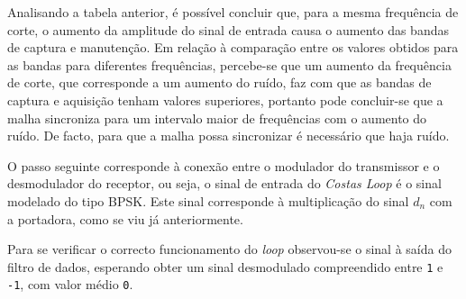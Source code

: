\documentclass[11pt]{article}
\numberwithin{equation}{section}
\begin{document}
Analisando a tabela anterior, é possível concluir que, para a mesma frequência de corte, o aumento da amplitude do sinal de entrada causa o aumento das bandas de captura e manutenção. Em relação à comparação entre os valores obtidos para as bandas para diferentes frequências, percebe-se que um aumento da frequência de corte, que corresponde a um aumento do ruído, faz com que as bandas de captura e aquisição tenham valores superiores, portanto pode concluir-se que a malha sincroniza para um intervalo maior de frequências com o aumento do ruído. De facto, para que a malha possa sincronizar é necessário que haja ruído.

O passo seguinte corresponde à conexão entre o modulador do transmissor e o desmodulador do receptor, ou seja, o sinal de entrada do \textit{Costas Loop} é o sinal modelado do tipo BPSK. Este sinal corresponde à multiplicação do sinal $d_n$ com a portadora, como se viu já anteriormente.

Para se verificar o correcto funcionamento do \textit{loop} observou-se o sinal à saída do filtro de dados, esperando obter um sinal desmodulado compreendido entre \texttt{1} e \texttt{-1}, com valor médio \texttt{0}.
\end{document}
